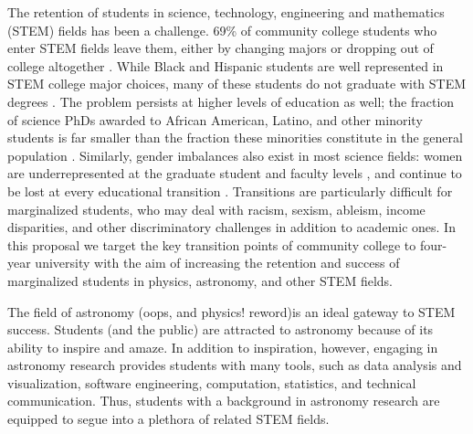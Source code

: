 \documentclass[12pt]{article}
\begin{document}
The retention of students in science, technology, engineering and mathematics (STEM) fields has been a challenge.  69\% of community college students who enter STEM fields leave them, either by changing majors or dropping out of college altogether \citep{NCES}.  While Black and Hispanic students are well represented in STEM college major choices, many of these students do not graduate with STEM degrees \citep{Ma15}.  The problem persists at higher levels of education as well; the fraction of science PhDs awarded to African American, Latino, and other minority students is far smaller than the fraction these minorities constitute in the general population \citep{NSF06,Ivie18}.   Similarly, gender imbalances also exist in most science fields: women are underrepresented at the graduate student and faculty levels \citep{NSF04,Ivie18}, and continue to be lost at every educational transition \citep{NAP}. 	Transitions are particularly difficult for marginalized students, who may deal with racism, sexism, ableism, income disparities, and other discriminatory challenges in addition to academic ones.  In this proposal we target the key transition points of community college to four-year university with the aim of increasing the retention and success of marginalized students in physics, astronomy, and other STEM fields.   







The field of astronomy (oops, and physics! reword)is an ideal gateway to STEM success.  Students (and the public) are attracted to astronomy because of its ability to inspire and amaze.  In addition to inspiration, however, engaging in astronomy research provides students with many tools, such as data analysis and visualization, software engineering, computation, statistics, and technical communication.  Thus, students with a background in astronomy research are equipped to segue into a plethora of related STEM fields.
	
\end{document}
